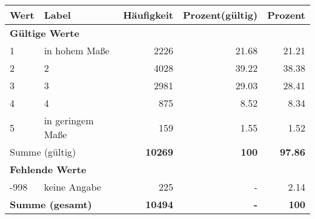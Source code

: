      \begin{longtable}{lXrrr}
     \toprule
     \textbf{Wert} & \textbf{Label} & \textbf{Häufigkeit} & \textbf{Prozent(gültig)} & \textbf{Prozent} \\
     \endhead
     \midrule
     \multicolumn{5}{l}{\textbf{Gültige Werte}}\\

     1 &
     \multicolumn{1}{X}{ in hohem Maße   } &


       \num{2226} &
       \num[round-mode=places,round-precision=2]{21,68} &
         \num[round-mode=places,round-precision=2]{21,21} \\

     2 &
     \multicolumn{1}{X}{ 2   } &


       \num{4028} &
       \num[round-mode=places,round-precision=2]{39,22} &
         \num[round-mode=places,round-precision=2]{38,38} \\

     3 &
     \multicolumn{1}{X}{ 3   } &


       \num{2981} &
       \num[round-mode=places,round-precision=2]{29,03} &
         \num[round-mode=places,round-precision=2]{28,41} \\

     4 &
     \multicolumn{1}{X}{ 4   } &


       \num{875} &
       \num[round-mode=places,round-precision=2]{8,52} &
         \num[round-mode=places,round-precision=2]{8,34} \\

     5 &
     \multicolumn{1}{X}{ in geringem Maße   } &


       \num{159} &
       \num[round-mode=places,round-precision=2]{1,55} &
         \num[round-mode=places,round-precision=2]{1,52} \\
     \midrule
     \multicolumn{2}{l}{Summe (gültig)} &
       \textbf{\num{10269}} &
     \textbf{100} &
       \textbf{\num[round-mode=places,round-precision=2]{97,86}} \\
     \multicolumn{5}{l}{\textbf{Fehlende Werte}}\\
       -998 &
       keine Angabe &
         \num{225} &
        - &
         \num[round-mode=places,round-precision=2]{2,14} \\
     \midrule
     \multicolumn{2}{l}{\textbf{Summe (gesamt)}} &
          \textbf{\num{10494}} &
        \textbf{-} &
        \textbf{100} \\
     \bottomrule
     \end{longtable}
     
